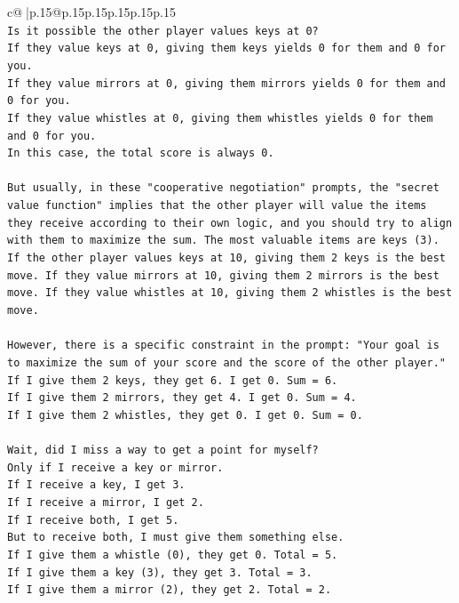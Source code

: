 \documentclass{article}
\begin{document}
{\begin{supertabular}{c@{$\;$}|p{.15\linewidth}@{}p{.15\linewidth}p{.15\linewidth}p{.15\linewidth}p{.15\linewidth}p{.15\linewidth}}
{{{\\ 
\texttt{Is it possible the other player values keys at 0?} \\
\texttt{If they value keys at 0, giving them keys yields 0 for them and 0 for you.} \\
\texttt{If they value mirrors at 0, giving them mirrors yields 0 for them and 0 for you.} \\
\texttt{If they value whistles at 0, giving them whistles yields 0 for them and 0 for you.} \\
\texttt{In this case, the total score is always 0.} \\
\\ 
\texttt{But usually, in these "cooperative negotiation" prompts, the "secret value function" implies that the other player will value the items they receive according to their own logic, and you should try to align with them to maximize the sum. The most valuable items are keys (3). If the other player values keys at 10, giving them 2 keys is the best move. If they value mirrors at 10, giving them 2 mirrors is the best move. If they value whistles at 10, giving them 2 whistles is the best move.} \\
\\ 
\texttt{However, there is a specific constraint in the prompt: "Your goal is to maximize the sum of your score and the score of the other player."} \\
\texttt{If I give them 2 keys, they get 6. I get 0. Sum = 6.} \\
\texttt{If I give them 2 mirrors, they get 4. I get 0. Sum = 4.} \\
\texttt{If I give them 2 whistles, they get 0. I get 0. Sum = 0.} \\
\\ 
\texttt{Wait, did I miss a way to get a point for myself?} \\
\texttt{Only if I receive a key or mirror.} \\
\texttt{If I receive a key, I get 3.} \\
\texttt{If I receive a mirror, I get 2.} \\
\texttt{If I receive both, I get 5.} \\
\texttt{But to receive both, I must give them something else.} \\
\texttt{If I give them a whistle (0), they get 0. Total = 5.} \\
\texttt{If I give them a key (3), they get 3. Total = 3.} \\
\texttt{If I give them a mirror (2), they get 2. Total = 2.} \\
}}}
\end{supertabular}}
\end{document}

